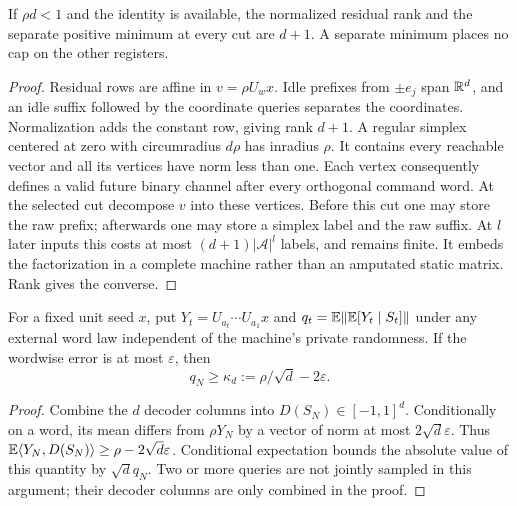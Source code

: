 \begin{proposition}\label{prop:separate}
If $\rho d<1$ and the identity is available, the normalized residual rank
and the separate positive minimum at every cut are $d+1$.
A separate minimum places no cap on the other registers.
\end{proposition}
\begin{proof}
Residual rows are affine in $v=\rho U_wx$. Idle prefixes from $\pm e_j$
span $\mathbb R^d$, and an idle suffix followed by the coordinate queries
separates the coordinates. Normalization adds the constant row, giving
rank $d+1$. A regular simplex centered at zero with circumradius $d\rho$
has inradius $\rho$. It contains every reachable vector and all its
vertices have norm less than one. Each vertex consequently defines a
valid future binary channel after every orthogonal command word.
At the selected cut decompose $v$ into these vertices. Before this cut
one may store the raw prefix; afterwards one may store a simplex label
and the raw suffix. At $l$ later inputs this costs at most
$(d+1)|\mathcal A|^l$ labels, and remains finite. It embeds the factorization
in a complete machine rather than an amputated static matrix. Rank gives
the converse.
\end{proof}

\begin{lemma}\label{lem:terminal}
For a fixed unit seed $x$, put $Y_t=U_{a_t}\cdots U_{a_1}x$ and
$q_t=\mathbb E\lVert\mathbb E[Y_t\mid S_t]\rVert$ under any external word law independent
of the machine's private randomness. If the wordwise error is at most
$\varepsilon$, then
\begin{equation}\label{eq:calibration}
 q_N\ge\kappa_d:=\rho/\sqrt d-2\varepsilon.
\end{equation}
\end{lemma}
\begin{proof}
Combine the $d$ decoder columns into $D(S_N)\in[-1,1]^d$.
Conditionally on a word, its mean differs from $\rho Y_N$ by a vector
of norm at most $2\sqrt d\varepsilon$. Thus
$\mathbb E\langle Y_N,D(S_N)\rangle\ge\rho-2\sqrt d\varepsilon$.
Conditional expectation bounds the absolute value of this quantity by
$\sqrt d q_N$. Two or more queries are not jointly sampled in this
argument; their decoder columns are only combined in the proof.
\end{proof}
